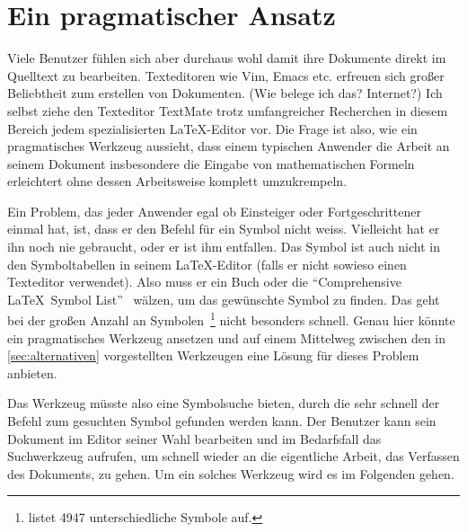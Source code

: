 \section{Ein pragmatischer Ansatz} %
\label{sec:pragmatisch}

Viele Benutzer fühlen sich aber durchaus wohl damit ihre Dokumente direkt im Quelltext zu bearbeiten. Texteditoren wie Vim, Emacs etc. erfreuen sich großer Beliebtheit zum erstellen von Dokumenten. (\TODO Wie belege ich das? Internet?) Ich selbst ziehe den Texteditor TextMate trotz umfangreicher Recherchen in diesem Bereich jedem spezialisierten \LaTeX-Editor vor. Die Frage ist also, wie ein pragmatisches Werkzeug aussieht, dass einem typischen Anwender die Arbeit an seinem Dokument insbesondere die Eingabe von mathematischen Formeln erleichtert ohne dessen Arbeitsweise komplett umzukrempeln.

Ein Problem, das jeder Anwender egal ob Einsteiger oder Fortgeschrittener einmal hat, ist, dass er den Befehl für ein Symbol nicht weiss. Vielleicht hat er ihn noch nie gebraucht, oder er ist ihm entfallen. Das Symbol ist auch nicht in den Symboltabellen in seinem \LaTeX-Editor (falls er nicht sowieso einen Texteditor verwendet). Also muss er ein Buch oder die "`Comprehensive \LaTeX\ Symbol List"'~\cite{Pakin:2009p2664} wälzen, um das gewünschte Symbol zu finden. Das geht bei der großen Anzahl an Symbolen~\footnote{\cite{Pakin:2009p2664} listet 4947 unterschiedliche Symbole auf.} nicht besonders schnell. Genau hier könnte ein pragmatisches Werkzeug ansetzen und auf einem Mittelweg zwischen den in \ref{sec:alternativen} vorgestellten Werkzeugen eine Lösung für dieses Problem anbieten.

Das Werkzeug müsste also eine Symbolsuche bieten, durch die sehr schnell der Befehl zum gesuchten Symbol gefunden werden kann. Der Benutzer kann sein Dokument im Editor seiner Wahl bearbeiten und im Bedarfsfall das Suchwerkzeug aufrufen, um schnell wieder an die eigentliche Arbeit, das Verfassen des Dokuments, zu gehen. Um ein solches Werkzeug wird es im Folgenden gehen.

